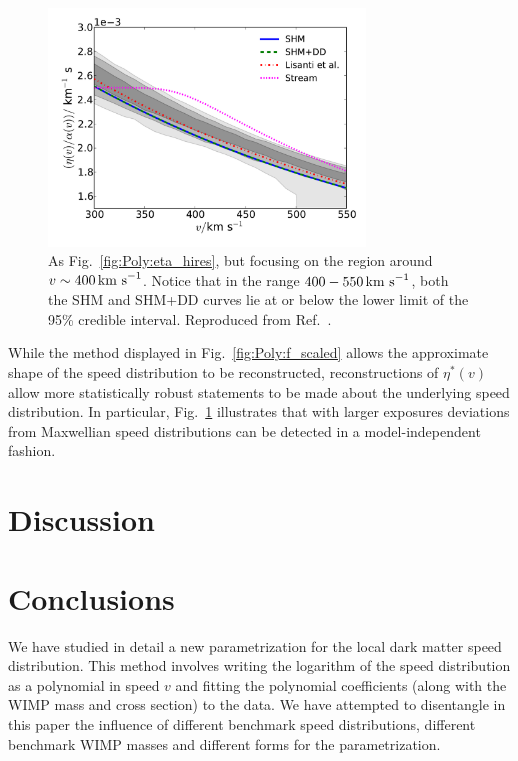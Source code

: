 \begin{figure}[t]
\centering
  \includegraphics[width=0.75\textwidth]{Poly/LIS_hires_zoom.pdf}
  \caption[As Fig.~\ref{fig:Poly:eta_hires}, but focusing on the region around $v \sim 400 \kms$.]{As Fig.~\ref{fig:Poly:eta_hires}, but focusing on the region around $v \sim 400 \kms$. Notice that in the range $400-550 \,\textrm{km s}^{-1}$, both the SHM and SHM+DD curves lie at or below the lower limit of the 95\% credible interval. Reproduced from Ref.~\cite{Kavanagh:2014}.}
  \label{fig:Poly:eta_hires_zoom}
\end{figure}

While the method displayed in Fig.~\ref{fig:Poly:f_scaled} allows the approximate shape of the speed distribution to be reconstructed, reconstructions of $\eta^*(v)$ allow more statistically robust statements to be made about the underlying speed distribution. In particular, Fig.~\ref{fig:Poly:eta_hires_zoom} illustrates that with larger exposures deviations from Maxwellian speed distributions can be detected in a model-independent fashion.

\section{Discussion}


\section{Conclusions}
\label{sec:Poly:conclusions}


We have studied in detail a new parametrization for the local dark matter speed distribution. This method involves writing the logarithm of the speed distribution as a polynomial in speed $v$ and fitting the polynomial coefficients (along with the WIMP mass and cross section) to the data. We have attempted to disentangle in this paper the influence of  different benchmark speed distributions, different benchmark WIMP masses and different forms for the parametrization. 

